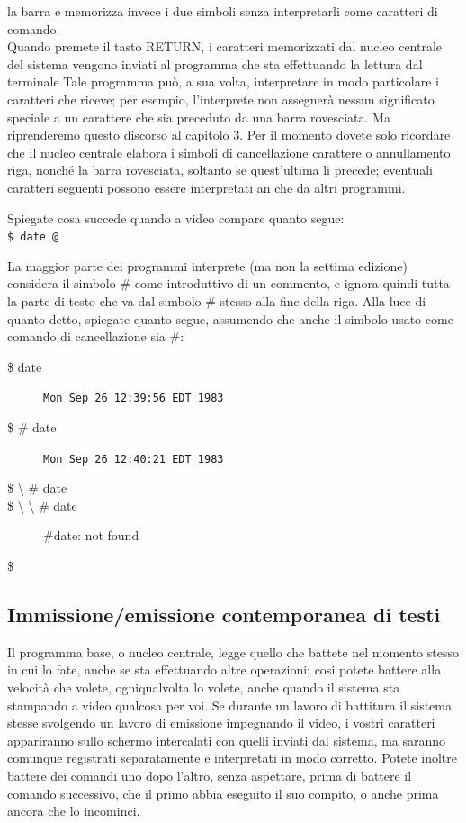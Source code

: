 la barra e memorizza invece i due simboli senza interpretarli come caratteri di
comando.\\
Quando premete il tasto RETURN, i caratteri memorizzati dal nucleo centrale del
sistema vengono inviati al programma che sta effettuando la lettura dal terminale
Tale programma può, a sua volta, interpretare in modo particolare i caratteri che riceve;
per esempio, l'interprete non assegnerà nessun significato speciale a un carattere
che sia preceduto da una barra rovesciata. Ma riprenderemo questo discorso al capitolo 3.
Per il momento dovete solo ricordare che il nucleo centrale elabora i simboli di cancellazione carattere o annullamento riga, nonché la barra rovesciata, soltanto
se quest'ultima li precede; eventuali caratteri seguenti possono essere interpretati an
che da altri programmi.
\begin{eser}
	Spiegate cosa succede quando a video compare quanto segue:\\
	{\tt \$ date @}
\end{eser}
\begin{eser}
	La maggior parte dei programmi interprete (ma non la settima edizione) considera il simbolo \#
	come introduttivo di un commento, e ignora quindi tutta la parte di testo che va dal simbolo \# stesso
	alla fine della riga. Alla luce di quanto detto, spiegate quanto segue, assumendo che anche il 
	simbolo usato come comando di cancellazione sia \#:
	\begin{description}
		\item[\$ date ]
		{\tt Mon Sep 26 12:39:56 EDT 1983}
		\item[\$  \# date ] 
		{\tt Mon Sep 26 12:40:21 EDT 1983}
		\item[\$ \textbackslash{} \# date]
		\item[\$ \textbackslash{} \textbackslash{} \# date] \#date: not found
		\item[\$ ]		
	\end{description}
\end{eser}
\subsection{Immissione/emissione contemporanea di testi}
Il programma base, o nucleo centrale, legge quello che battete nel momento stesso in
cui lo fate, anche se sta effettuando altre operazioni; cosi potete battere alla velocità
che volete, ogniqualvolta lo volete, anche quando il sistema sta stampando a video
qualcosa per voi. Se durante un lavoro di battitura il sistema stesse svolgendo un lavoro
di emissione impegnando il video, i vostri caratteri appariranno sullo schermo
intercalati con quelli inviati dal sistema, ma saranno comunque registrati separatamente
e interpretati in modo corretto. Potete inoltre battere dei comandi uno dopo
l'altro, senza aspettare, prima di battere il comando successivo, che il primo abbia
eseguito il suo compito, o anche prima ancora che lo incominci.
